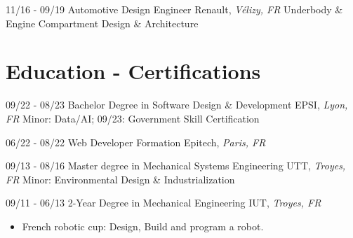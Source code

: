 \documentclass[]{friggeri-cv}
\begin{document}
\begin{entrylist}
  \entry
    {11/16 - 09/19}
    {Automotive Design Engineer}
    {Renault, \textit{Vélizy, FR}}
    {Underbody \& Engine Compartment Design \& Architecture}
\end{entrylist}

\vspace*{-0.5cm}
\vspace*{0.45cm}
\section{Education - Certifications}
\vspace*{-0.25cm}
\vspace{0.5mm}
    \begin{entrylist}
    \entry
        {09/22 - 08/23}
        {Bachelor Degree in Software Design \& Development}
        {EPSI, \textit{Lyon, FR}}
        {Minor: Data/AI; \hspace{7mm} 09/23: Government Skill Certification}
    \end{entrylist}
    \vspace{0.5mm}
\begin{entrylist}
\entry
    {06/22 - 08/22}
    {Web Developer Formation}
    {Epitech, \textit{Paris, FR}}
    {}
\end{entrylist}
\vspace{0.5mm}
    \begin{entrylist}
    \entry
        {09/13 - 08/16}
        {Master degree in Mechanical Systems Engineering}
        {UTT, \textit{Troyes, FR}}
        {Minor: Environmental Design \& Industrialization}
    \end{entrylist}
    \vspace{0.5mm}
\begin{entrylist}
\entry
    {09/11 - 06/13}
    {2-Year Degree in Mechanical Engineering}
    {IUT, \textit{Troyes, FR}}
    {}
\end{entrylist}
\vspace*{-0.7cm}
\begin{itemize}
\setlength{\itemsep}{1pt}
\setlength{\parskip}{0pt}
\setlength{\parsep}{0pt}
\item French robotic cup: Design, Build and program a robot.
\end{itemize}
\end{document}
